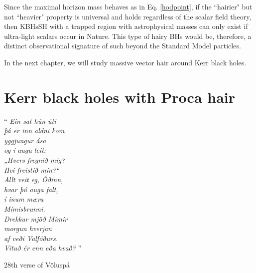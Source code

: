 \bigskip

Since the maximal horizon mass behaves as in Eq. \eqref{hodpoint}, if the ``hairier" but not ``heavier" property is universal and holds regardless of the scalar field theory, then KBHsSH with a trapped region with astrophysical masses can only exist if ultra-light scalars occur in Nature. This type of hairy BHs would be, therefore, a distinct observational signature of such beyond the Standard Model particles.

\bigskip

In the next chapter, we will study massive vector hair around Kerr black holes.
%
%
%
%  
\chapter{Kerr black holes with Proca hair}
\label{ch:proca}

\epigraph{``\emph{
Ein sat hún úti \\
þá er inn aldni kom \\
yggjungur ása \\
og í augu leit: \\
„Hvers fregnið mig? \\
Hví freistið mín?“ \\
Allt veit eg, Óðinn, \\
hvar þú auga falt, \\
í inum mæra \\
Mímisbrunni. \\
Drekkur mjöð Mímir \\
morgun hverjan \\
af veði Valföðurs. \\
Vituð ér enn eða hvað? 
} 
''}{28th verse of Völuspá}


